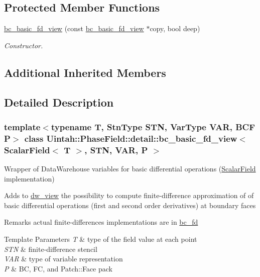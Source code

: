 \subsection*{Protected Member Functions}
\begin{DoxyCompactItemize}
\item 
\hyperlink{classUintah_1_1PhaseField_1_1detail_1_1bc__basic__fd__view_3_01ScalarField_3_01T_01_4_00_01STN_00_01VAR_00_01P_01_4_abb5dbc3676f8c31fd3fce28c505b941a}{bc\+\_\+basic\+\_\+fd\+\_\+view} (const \hyperlink{classUintah_1_1PhaseField_1_1detail_1_1bc__basic__fd__view}{bc\+\_\+basic\+\_\+fd\+\_\+view} $\ast$copy, bool deep)
\begin{DoxyCompactList}\small\item\em Constructor. \end{DoxyCompactList}\end{DoxyCompactItemize}
\subsection*{Additional Inherited Members}


\subsection{Detailed Description}
\subsubsection*{template$<$typename T, Stn\+Type S\+TN, Var\+Type V\+AR, B\+CF P$>$\newline
class Uintah\+::\+Phase\+Field\+::detail\+::bc\+\_\+basic\+\_\+fd\+\_\+view$<$ Scalar\+Field$<$ T $>$, S\+T\+N, V\+A\+R, P $>$}

Wrapper of Data\+Warehouse variables for basic differential operations (\hyperlink{structUintah_1_1PhaseField_1_1ScalarField}{Scalar\+Field} implementation) 

Adds to \hyperlink{classUintah_1_1PhaseField_1_1detail_1_1dw__view}{dw\+\_\+view} the possibility to compute finite-\/difference approximation of of basic differential operations (first and second order derivatives) at boundary faces

\begin{DoxyRemark}{Remarks}
actual finite-\/differences implementations are in \hyperlink{classUintah_1_1PhaseField_1_1detail_1_1bc__fd}{bc\+\_\+fd}
\end{DoxyRemark}

\begin{DoxyTemplParams}{Template Parameters}
{\em T} & type of the field value at each point \\
\hline
{\em S\+TN} & finite-\/difference stencil \\
\hline
{\em V\+AR} & type of variable representation \\
\hline
{\em P} & BC, FC, and Patch\+::\+Face pack \\
\hline
\end{DoxyTemplParams}


